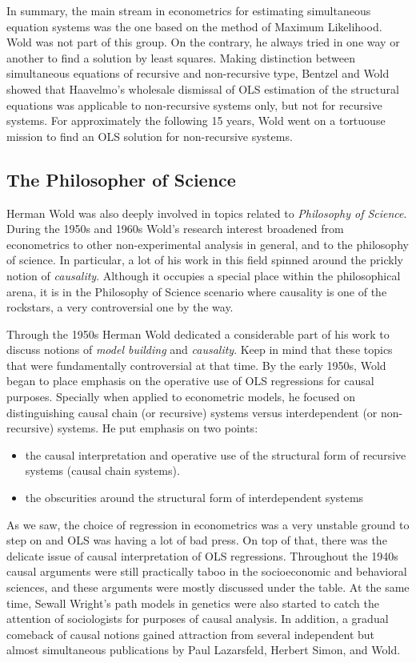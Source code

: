 \documentclass[12pt]{book}\usepackage{graphicx, color}
\begin{document}
In summary, the main stream in econometrics for estimating simultaneous equation systems was the one based on the method of Maximum Likelihood. Wold was not part of this group. On the contrary, he always tried in one way or another to find a solution by least squares. Making distinction between simultaneous equations of recursive and non-recursive type, Bentzel and Wold showed that Haavelmo's wholesale dismissal of OLS estimation of the structural equations was applicable to non-recursive systems only, but not for recursive systems. For approximately the following 15 years, Wold went on a tortuouse mission to find an OLS solution for non-recursive systems.



\subsection{The Philosopher of Science}
Herman Wold was also deeply involved in topics related to \textit{Philosophy of Science}. During the 1950s and 1960s Wold's research interest broadened from econometrics to other non-experimental analysis in general, and to the philosophy of science. In particular, a lot of his work in this field spinned around the prickly notion of \textit{causality}. Although it occupies a special place within the philosophical arena, it is in the Philosophy of Science scenario where causality is one of the rockstars, a very controversial one by the way. 

Through the 1950s Herman Wold dedicated a considerable part of his work to discuss notions of \textit{model building} and \textit{causality}. Keep in mind that these topics that were fundamentally controversial at that time. By the early 1950s, Wold began to place emphasis on the operative use of OLS regressions for causal purposes. Specially when applied to econometric models, he focused on distinguishing causal chain (or recursive) systems versus interdependent (or non-recursive) systems. He put emphasis on two points:
\begin{itemize}
 \item the causal interpretation and operative use of the structural form of recursive systems (causal chain systems).  
 \item the obscurities around the structural form of interdependent systems
\end{itemize}

As we saw, the choice of regression in econometrics was a very unstable ground to step on and OLS was having a lot of bad press. On top of that, there was the delicate issue of causal interpretation of OLS regressions. Throughout the 1940s causal arguments were still practically taboo in the socioeconomic and behavioral sciences, and these arguments were mostly discussed under the table. At the same time, Sewall Wright's path models in genetics were also started to catch the attention of sociologists for purposes of causal analysis. In addition, a gradual comeback of causal notions gained attraction from several independent but almost simultaneous publications by Paul Lazarsfeld, Herbert Simon, and Wold. 
\end{document}
